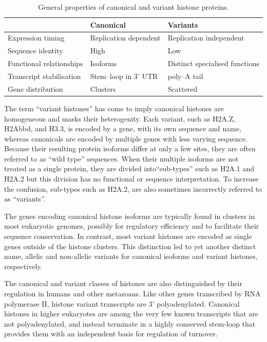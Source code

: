 \documentclass[10pt,a4paper,onecolumn,article]{memoir}
\newcommand{\addref}[1][]{\todo[color=red!40,size=\tiny]{Add reference: #1}}
\begin{document}
    \begin{table}
      \caption{General properties of canonical and variant histone proteins.}
      \label{tab:typical-histone-differences}
      \centering
      \begin{tabular}{l l l}
        \toprule
        \null                     & Canonical             & Variants \\
        \midrule
        Expression timing         & Replication dependent & Replication independent \\
        Sequence identity         & High                  & Low \\
        Functional relationships  & Isoforms              & Distinct specialised functions \\
        Transcript stabilisation  & Stem--loop in 3' UTR  & poly--A tail \\
        Gene distribution         & Clusters              & Scattered \\
        \bottomrule
      \end{tabular}
    \end{table}

    The term ``variant histones'' has come to imply canonical histones are homogeneous
    and masks their heterogenity. Each variant, such as H2A.Z, H2Abbd, and H3.3,
    is encoded by a gene, with its own sequence and name,
    whereas canonicals are encoded by multiple genes with less varying sequence.
    Because their resulting protein isoforms differ at only a few sites, they are often
    referred to as ``wild type'' sequences.
    When their multiple isoforms are not treated as a single protein, they are divided
    into``sub-types'' such as H2A.1 and H2A.2 but this division has no functional or sequence
    interpretation. To increase the confusion, sub-types such as H2A.2, are also sometimes incorrectly
    referred to as ``variants''\addref{}.

    The genes encoding canonical histone isoforms are typically found in clusters in most eukaryotic
    genomes, possibly for regulatory efficiency and to facilitate their sequence conservation. In
    contrast, most variant histones are encoded as single genes outside of the histone clusters.
    This distinction led to yet another distinct name, allelic and non-allelic variants for
    canonical isoforms and variant histones, respectively\addref{}.

    The canonical and variant classes of histones are also distinguished by their regulation in humans and other
    metazoans. Like other genes transcribed by RNA polymerase II,  histone variant transcripts
    are 3' polyadenylated. Canonical histones in higher eukaryotes are among the very few known transcripts
    that are not polyadenylated, and instead terminate in a highly conserved stem-loop that
    provides them with an independent basis for regulation of turnover.
\end{document}
